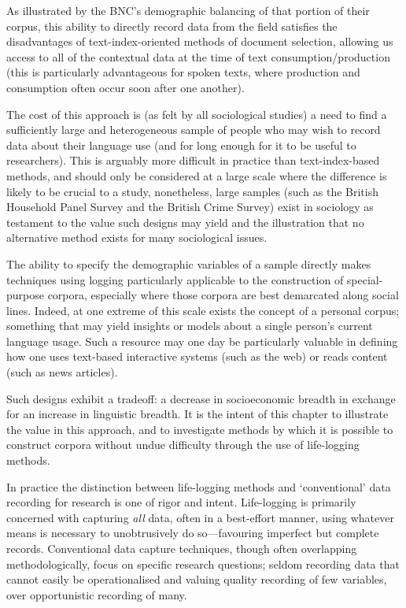 As illustrated by the BNC's demographic balancing of that portion of their corpus, this ability to directly record data from the field satisfies the disadvantages of text-index-oriented methods of document selection, allowing us access to all of the contextual data at the time of text consumption/production (this is particularly advantageous for spoken texts, where production and consumption often occur soon after one another).

The cost of this approach is (as felt by all sociological studies) a need to find a sufficiently large and heterogeneous sample of people who may wish to record data about their language use (and for long enough for it to be useful to researchers).  This is arguably more difficult in practice than text-index-based methods, and should only be considered at a large scale where the difference is likely to be crucial to a study, nonetheless, large samples (such as the British Household Panel Survey\cite{taylor1996british} and the British Crime Survey\cite{hough1983british}) exist in sociology as testament to the value such designs may yield and the illustration that no alternative method exists for many sociological issues.

The ability to specify the demographic variables of a sample directly makes techniques using logging particularly applicable to the construction of special-purpose corpora, especially where those corpora are best demarcated along social lines.  Indeed, at one extreme of this scale exists the concept of a personal corpus; something that may yield insights or models about a single person's current language usage.  Such a resource may one day be particularly valuable in defining how one uses text-based interactive systems (such as the web) or reads content (such as news articles).

Such designs exhibit a tradeoff: a decrease in socioeconomic breadth in exchange for an increase in linguistic breadth.  It is the intent of this chapter to illustrate the value in this approach, and to investigate methods by which it is possible to construct corpora without undue difficulty through the use of life-logging methods.




In practice the distinction between life-logging methods and `conventional' data recording for research is one of rigor and intent.  Life-logging is primarily concerned with capturing \textsl{all} data, often in a best-effort manner, using whatever means is necessary to unobtrusively do so---favouring imperfect but complete records.  Conventional data capture techniques, though often overlapping methodologically, focus on specific research questions; seldom recording data that cannot easily be operationalised and valuing quality recording of few variables, over opportunistic recording of many.



